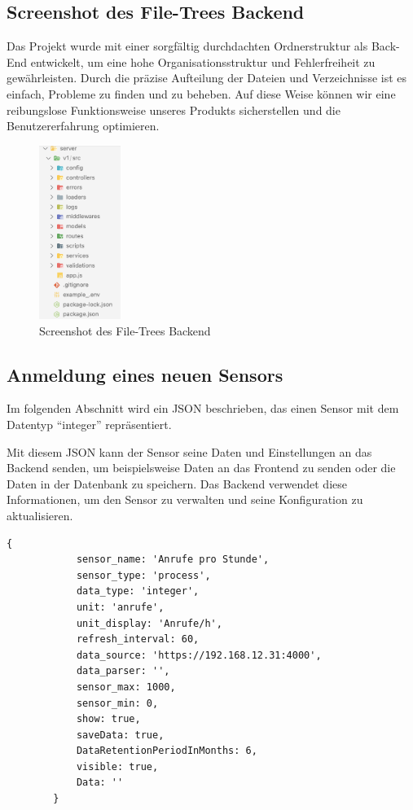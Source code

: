 \subsection{Screenshot des File-Trees Backend}\label{appendix:b5}\par
Das Projekt wurde mit einer sorgfältig durchdachten Ordnerstruktur als Back-End entwickelt, um eine hohe Organisationsstruktur und Fehlerfreiheit zu gewährleisten.
Durch die präzise Aufteilung der Dateien und Verzeichnisse ist es einfach, Probleme zu finden und zu beheben.
Auf diese Weise können wir eine reibungslose Funktionsweise unseres Produkts sicherstellen und die Benutzererfahrung optimieren.
\begin{figure}[htbp]
	\centering
	\includegraphics[width=100px]{img/vsd.png}
	\caption{Screenshot des File-Trees Backend}
\end{figure}
\clearpage


\subsection{Anmeldung eines neuen Sensors}\label{appendix:b3}\par
Im folgenden Abschnitt wird ein \acs{JSON} beschrieben, das einen Sensor mit dem Datentyp “integer” repräsentiert.


Mit diesem \acs{JSON} kann der Sensor seine Daten und Einstellungen an das Backend senden, um beispielsweise Daten an das Frontend zu senden oder die Daten in der Datenbank zu speichern. Das Backend verwendet diese Informationen, um den Sensor zu verwalten und seine Konfiguration zu aktualisieren.
	\begin{lstlisting}[caption={Anmeldung eines neuen Sensors (Backend)  JSON-Modell}, style=js]
		{
			sensor_name: 'Anrufe pro Stunde',
			sensor_type: 'process',
			data_type: 'integer',
			unit: 'anrufe',
			unit_display: 'Anrufe/h',
			refresh_interval: 60,
			data_source: 'https://192.168.12.31:4000',
			data_parser: '',
			sensor_max: 1000,
			sensor_min: 0,
			show: true,
			saveData: true,
			DataRetentionPeriodInMonths: 6,
			visible: true,
			Data: ''
		}
	\end{lstlisting}
\clearpage



